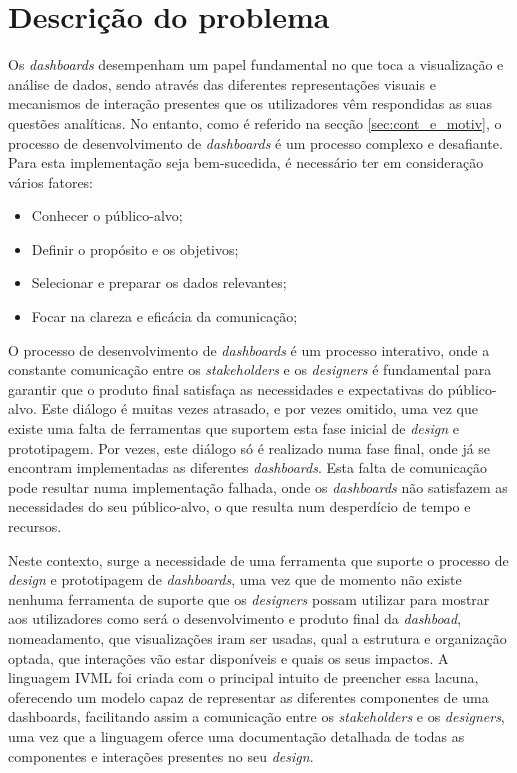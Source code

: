\section{Descrição do problema}
\label{sec:des_problema}

Os \textit{dashboards} desempenham um papel fundamental no que toca a visualização e análise de dados, sendo através das diferentes representações visuais e mecanismos de interação presentes que os utilizadores vêm respondidas as suas questões analíticas. No entanto, como é referido na secção \ref{sec:cont_e_motiv}, o processo de desenvolvimento de \textit{dashboards} é um processo complexo e desafiante. Para esta implementação seja bem-sucedida, é necessário ter em consideração vários fatores:

\begin{itemize}
    \item Conhecer o público-alvo;
    \item Definir o propósito e os objetivos;
    \item Selecionar e preparar os dados relevantes;
    \item Focar na clareza e eficácia da comunicação;
\end{itemize}

O processo de desenvolvimento de \textit{dashboards} é um processo interativo, onde a constante comunicação entre os \textit{stakeholders} e os \textit{designers} é fundamental para garantir que o produto final satisfaça as necessidades e expectativas do público-alvo. Este diálogo é muitas vezes atrasado, e por vezes omitido, uma vez que existe uma falta de ferramentas que suportem esta fase inicial de \textit{design} e prototipagem. Por vezes, este diálogo só é realizado numa fase final, onde já se encontram implementadas as diferentes \textit{dashboards}. Esta falta de comunicação pode resultar numa implementação falhada, onde os \textit{dashboards} não satisfazem as necessidades do seu público-alvo, o que resulta num desperdício de tempo e recursos.

Neste contexto, surge a necessidade de uma ferramenta que suporte o processo de \textit{design} e prototipagem de \textit{dashboards}, uma vez que de momento não existe nenhuma ferramenta de suporte que os \textit{designers} possam utilizar para mostrar aos utilizadores como será o desenvolvimento e produto final da \textit{dashboad}, nomeadamento, que visualizações iram ser usadas, qual a estrutura e organização optada, que interações vão estar disponíveis e quais os seus impactos. A linguagem \gls{IVML} foi criada com o principal intuito de preencher essa lacuna, oferecendo um modelo capaz de representar as diferentes componentes de uma dashboards, facilitando assim a comunicação entre os \textit{stakeholders} e os \textit{designers}, uma vez que a linguagem oferce uma documentação detalhada de todas as componentes e interações presentes no seu \textit{design}.

